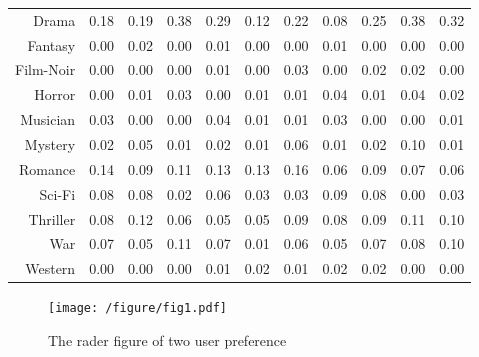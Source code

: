 \begin{table}
\begin{tabular}{rrrrrrrrrrr}
     Drama &      0.18  &      0.19  &      0.38  &      0.29  &      0.12  &      0.22  &      0.08  &      0.25  &      0.38  &      0.32  \\

   Fantasy &      0.00  &      0.02  &      0.00  &      0.01  &      0.00  &      0.00  &      0.01  &      0.00  &      0.00  &      0.00  \\

 Film-Noir &      0.00  &      0.00  &      0.00  &      0.01  &      0.00  &      0.03  &      0.00  &      0.02  &      0.02  &      0.00  \\

    Horror &      0.00  &      0.01  &      0.03  &      0.00  &      0.01  &      0.01  &      0.04  &      0.01  &      0.04  &      0.02  \\

  Musician &      0.03  &      0.00  &      0.00  &      0.04  &      0.01  &      0.01  &      0.03  &      0.00  &      0.00  &      0.01  \\

   Mystery &      0.02  &      0.05  &      0.01  &      0.02  &      0.01  &      0.06  &      0.01  &      0.02  &      0.10  &      0.01  \\

   Romance &      0.14  &      0.09  &      0.11  &      0.13  &      0.13  &      0.16  &      0.06  &      0.09  &      0.07  &      0.06  \\

    Sci-Fi &      0.08  &      0.08  &      0.02  &      0.06  &      0.03  &      0.03  &      0.09  &      0.08  &      0.00  &      0.03  \\

  Thriller &      0.08  &      0.12  &      0.06  &      0.05  &      0.05  &      0.09  &      0.08  &      0.09  &      0.11  &      0.10  \\

       War &      0.07  &      0.05  &      0.11  &      0.07  &      0.01  &      0.06  &      0.05  &      0.07  &      0.08  &      0.10  \\

   Western &      0.00  &      0.00  &      0.00  &      0.01  &      0.02  &      0.01  &      0.02  &      0.02  &      0.00  &      0.00  \\

\end{tabular}
 \end{table}
\begin{figure}[htbp]
\centering
\texttt{[image: /figure/fig1.pdf]}
\caption{The rader figure of two user preference} \label{fig:1}
\end{figure}

